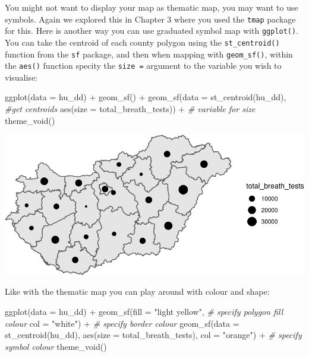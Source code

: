 \documentclass[
]{book}
\makeatletter
\newenvironment{Shaded}{\begin{snugshade}}{\end{snugshade}}
\newcommand{\AttributeTok}[1]{\textcolor[rgb]{0.61,0.61,0.61}{#1}}
\newcommand{\CommentTok}[1]{\textcolor[rgb]{0.37,0.37,0.37}{\textit{#1}}}
\newcommand{\FunctionTok}[1]{\textcolor[rgb]{0,0,0}{#1}}
\newcommand{\NormalTok}[1]{#1}
\newcommand{\SpecialCharTok}[1]{\textcolor[rgb]{0,0,0}{#1}}
\newcommand{\StringTok}[1]{\textcolor[rgb]{0.5,0.5,0.5}{#1}}
\newenvironment{kframe}{%
\medskip{}
\setlength{\fboxsep}{.8em}
 \def\at@end@of@kframe{}%
 \ifinner\ifhmode%
  \def\at@end@of@kframe{\end{minipage}}%
  \begin{minipage}{\columnwidth}%
 \fi\fi%
 \def\FrameCommand##1{\hskip\@totalleftmargin \hskip-\fboxsep
 \colorbox{shadecolor}{##1}\hskip-\fboxsep
     \hskip-\linewidth \hskip-\@totalleftmargin \hskip\columnwidth}%
 \MakeFramed {\advance\hsize-\width
   \@totalleftmargin\z@ \linewidth\hsize
   \@setminipage}}%
 {\par\unskip\endMakeFramed%
 \at@end@of@kframe}
\renewenvironment{Shaded}{\begin{kframe}}{\end{kframe}}
\makeatother
\begin{document}
You might not want to display your map as thematic map, you may want to use symbols. Again we explored this in Chapter 3 where you used the \texttt{tmap} package for this. Here is another way you can use graduated symbol map with \texttt{ggplot()}. You can take the centroid of each county polygon using the \texttt{st\_centroid()} function from the \texttt{sf} package, and then when mapping with \texttt{geom\_sf()}, within the \texttt{aes()} function specity the \texttt{size\ =} argument to the variable you wish to visualise:

\begin{Shaded}
\begin{Highlighting}[]
\FunctionTok{ggplot}\NormalTok{(}\AttributeTok{data =}\NormalTok{ hu\_dd) }\SpecialCharTok{+} 
  \FunctionTok{geom\_sf}\NormalTok{() }\SpecialCharTok{+} 
  \FunctionTok{geom\_sf}\NormalTok{(}\AttributeTok{data =} \FunctionTok{st\_centroid}\NormalTok{(hu\_dd),  }\CommentTok{\#get centroids}
          \FunctionTok{aes}\NormalTok{(}\AttributeTok{size =}\NormalTok{ total\_breath\_tests)) }\SpecialCharTok{+}  \CommentTok{\# variable for size}
  \FunctionTok{theme\_void}\NormalTok{()}
\end{Highlighting}
\end{Shaded}

\includegraphics{crime_mapping_files/figure-latex/gradsymbmap-1.pdf}

Like with the thematic map you can play around with colour and shape:

\begin{Shaded}
\begin{Highlighting}[]
\FunctionTok{ggplot}\NormalTok{(}\AttributeTok{data =}\NormalTok{ hu\_dd) }\SpecialCharTok{+} 
  \FunctionTok{geom\_sf}\NormalTok{(}\AttributeTok{fill =} \StringTok{"light yellow"}\NormalTok{,   }\CommentTok{\# specify polygon fill colour}
          \AttributeTok{col =} \StringTok{"white"}\NormalTok{) }\SpecialCharTok{+}    \CommentTok{\# specify border colour}
  \FunctionTok{geom\_sf}\NormalTok{(}\AttributeTok{data =} \FunctionTok{st\_centroid}\NormalTok{(hu\_dd), }
          \FunctionTok{aes}\NormalTok{(}\AttributeTok{size =}\NormalTok{ total\_breath\_tests), }
          \AttributeTok{col =} \StringTok{"orange"}\NormalTok{) }\SpecialCharTok{+}  \CommentTok{\# specify symbol colour}
  \FunctionTok{theme\_void}\NormalTok{()}
\end{Highlighting}
\end{Shaded}
\end{document}
